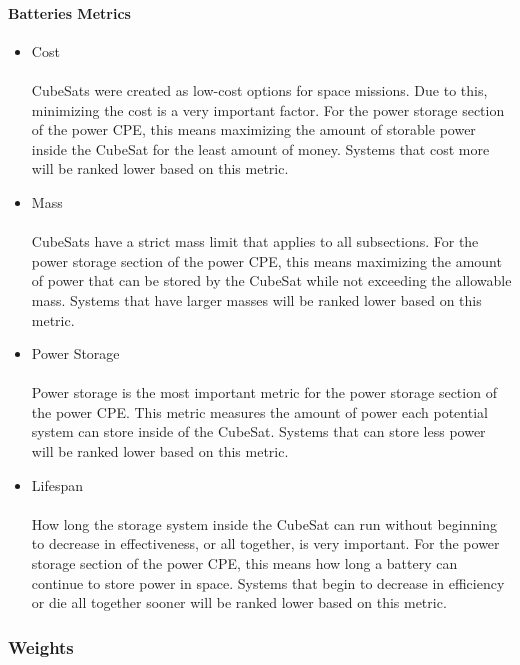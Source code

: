 \documentclass[3p]{elsarticle}
\begin{document}
\paragraph{Batteries Metrics}
\begin{itemize}
\item Cost\\
\\
CubeSats were created as low-cost options for space missions.  Due to this, minimizing the cost is a very important factor.  For the power storage section of the power CPE,  this means maximizing the amount of storable power inside the CubeSat for the least amount of money.  Systems that cost more will be ranked lower based on this metric.
\item{Mass} \\
\\
CubeSats have a strict mass limit that applies to all subsections.  For the power storage section of the power CPE, this means maximizing the amount of power that can be stored by the CubeSat while not exceeding the allowable mass.  Systems that have larger masses will be ranked lower based on this metric.
\item{Power Storage} \\
\\
Power storage is the most important metric for the power storage section of the power CPE.  This metric measures the amount of power each potential system can store inside of the CubeSat.  Systems that can store less power will be ranked lower based on this metric.
\item{Lifespan} \\
\\
How long the storage system inside the CubeSat can run without beginning to decrease in effectiveness, or all together, is very important.  For the power storage section of the power CPE, this means how long a battery can continue to store power in space.  Systems that begin to decrease in efficiency or die all together sooner will be ranked lower based on this metric.
\end{itemize}
\subsubsection{Weights}
\end{document}
